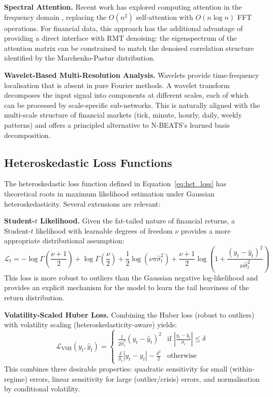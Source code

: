 \documentclass[conference]{IEEEtran}
\begin{document}
\textbf{Spectral Attention.} Recent work has explored computing attention in the frequency domain \cite{lee2021fnet}, replacing the $O(n^2)$ self-attention with $O(n \log n)$ FFT operations. For financial data, this approach has the additional advantage of providing a direct interface with RMT denoising: the eigenspectrum of the attention matrix can be constrained to match the denoised correlation structure identified by the Marchenko-Pastur distribution.

\textbf{Wavelet-Based Multi-Resolution Analysis.} Wavelets provide time-frequency localisation that is absent in pure Fourier methods. A wavelet transform decomposes the input signal into components at different scales, each of which can be processed by scale-specific sub-networks. This is naturally aligned with the multi-scale structure of financial markets (tick, minute, hourly, daily, weekly patterns) and offers a principled alternative to N-BEATS's learned basis decomposition.

\subsection{Heteroskedastic Loss Functions}

The heteroskedastic loss function defined in Equation~\ref{eq:het_loss} has theoretical roots in maximum likelihood estimation under Gaussian heteroskedasticity. Several extensions are relevant:

\textbf{Student-$t$ Likelihood.} Given the fat-tailed nature of financial returns, a Student-$t$ likelihood with learnable degrees of freedom $\nu$ provides a more appropriate distributional assumption:
\begin{equation}
\mathcal{L}_t = -\log \Gamma\!\left(\frac{\nu+1}{2}\right) + \log \Gamma\!\left(\frac{\nu}{2}\right) + \frac{1}{2}\log(\nu\pi\hat{\sigma}_t^2) + \frac{\nu+1}{2}\log\!\left(1 + \frac{(y_t - \hat{y}_t)^2}{\nu\hat{\sigma}_t^2}\right)
\end{equation}
This loss is more robust to outliers than the Gaussian negative log-likelihood and provides an explicit mechanism for the model to learn the tail heaviness of the return distribution.

\textbf{Volatility-Scaled Huber Loss.} Combining the Huber loss (robust to outliers) with volatility scaling (heteroskedasticity-aware) yields:
\begin{equation}
\mathcal{L}_{\text{VSH}}(y_t, \hat{y}_t) = \begin{cases}
\frac{1}{2\hat{\sigma}_t^2}(y_t - \hat{y}_t)^2 & \text{if } \left|\frac{y_t - \hat{y}_t}{\hat{\sigma}_t}\right| \le \delta \\[6pt]
\frac{\delta}{\hat{\sigma}_t}\left|y_t - \hat{y}_t\right| - \frac{\delta^2}{2} & \text{otherwise}
\end{cases}
\end{equation}
This combines three desirable properties: quadratic sensitivity for small (within-regime) errors, linear sensitivity for large (outlier/crisis) errors, and normalisation by conditional volatility.
\end{document}
